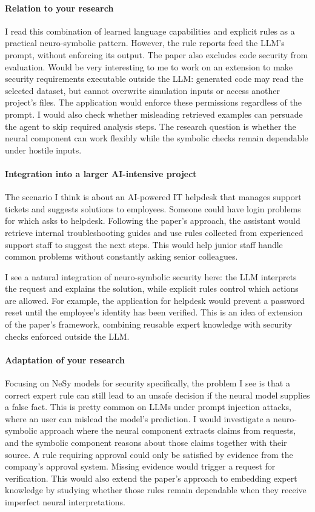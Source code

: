 \documentclass[11pt]{article}
\begin{document}
\paragraph{Relation to your research}
I read this combination of learned language capabilities and explicit rules as a practical neuro-symbolic pattern. However, the rule reports feed the LLM's prompt, without enforcing its output. The paper also excludes code security from evaluation. Would be very interesting to me to work on an extension to make security requirements executable outside the LLM: generated code may read the selected dataset, but cannot overwrite simulation inputs or access another project's files. The application would enforce these permissions regardless of the prompt. I would also check whether misleading retrieved examples can persuade the agent to skip required analysis steps. The research question is whether the neural component can work flexibly while the symbolic checks remain dependable under hostile inputs.

\paragraph{Integration into a larger AI-intensive project}
The scenario I think is about an AI-powered IT helpdesk that manages support tickets and suggests solutions to employees. Someone could have login problems for which asks to helpdesk. Following the paper's approach, the assistant would retrieve internal troubleshooting guides and use rules collected from experienced support staff to suggest the next steps. This would help junior staff handle common problems without constantly asking senior colleagues.

I see a natural integration of neuro-symbolic security here: the LLM interprets the request and explains the solution, while explicit rules control which actions are allowed. For example, the application for helpdesk would prevent a password reset until the employee's identity has been verified. This is an idea of extension of the paper's framework, combining reusable expert knowledge with security checks enforced outside the LLM.

\paragraph{Adaptation of your research}
Focusing on NeSy models for security specifically, the problem I see is that a correct expert rule can still lead to an unsafe decision if the neural model supplies a false fact. This is pretty common on LLMs under prompt injection attacks, where an user can mislead the model's prediction.
I would investigate a neuro-symbolic approach where the neural component extracts claims from requests, and the symbolic component reasons about those claims together with their source. A rule requiring approval could only be satisfied by evidence from the company's approval system. Missing evidence would trigger a request for verification.
This would also extend the paper's approach to embedding expert knowledge by studying whether those rules remain dependable when they receive imperfect neural interpretations. 
\end{document}
